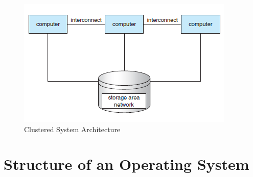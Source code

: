 \documentclass{article}
\theoremstyle{plain}
\theoremstyle{definition}
\begin{document}
\begin{figure}
    \centering
    \includegraphics{os5.png}
    \caption{Clustered System Architecture}
    \label{fig:my_label_5}
\end{figure}

\section{Structure of an Operating System}
\end{document}
